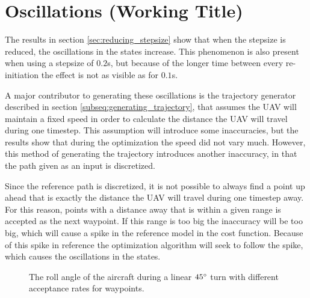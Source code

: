 \section{Oscillations (Working Title)}

The results in section \ref{sec:reducing_stepsize} show that when the stepsize is reduced, the oscillations in the states increase. This phenomenon is also present when using a stepsize of $0.2$s, but because of the longer time between every re-initiation the effect is not as visible as for $0.1$s.

A major contributor to generating these oscillations is the trajectory generator described in section \ref{subseq:generating_trajectory}, that assumes the UAV will maintain a fixed speed in order to calculate the distance the UAV will travel during one timestep. This assumption will introduce some inaccuracies, but the results show that during the optimization the speed did not vary much. However, this method of generating the trajectory introduces another inaccuracy, in that the path given as an input is discretized.

Since the reference path is discretized, it is not possible to always find a point up ahead that is exactly the distance the UAV will travel during one timestep away. For this reason, points with a distance away that is within a given range is accepted as the next waypoint. If this range is too big the inaccuracy will be too big, which will cause a spike in the reference model in the cost function. Because of this spike in reference the optimization algorithm will seek to follow the spike, which causes the oscillations in the states.

\begin{figure}[]
	\centering
	\caption{The roll angle of the aircraft during a linear $45\degree$ turn with different acceptance rates for waypoints.}
	\label{fig:oscillating_attitude}
\end{figure}

